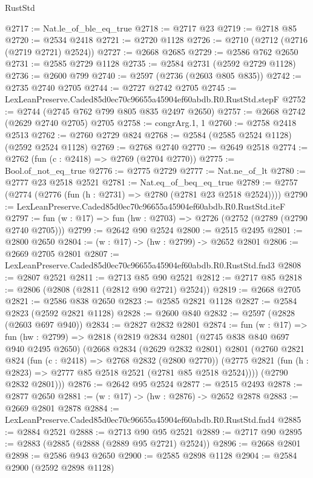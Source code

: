 \begin{lexlean}{RustStd}
\begin{coremodule}
@2717 := Nat.le_of_ble_eq_true
@2718 := @2717 @23
@2719 := @2718 @85
@2720 := @2534 @2418
@2721 := @2720 @1128
@2726 := @2710 (@2712 (@2716 (@2719 @2721) @2524))
@2727 := @2668 @2685
@2729 := @2586 @762 @2650
@2731 := @2585 @2729 @1128
@2735 := @2584 @2731 (@2592 @2729 @1128)
@2736 := @2600 @799
@2740 := @2597 (@2736 (@2603 @805 @835))
@2742 := @2735 @2740 @2705
@2744 := @2727 @2742 @2705
@2745 := LexLeanPreserve.Caded85d0ec70c96655a45904ef60abdb.R0.RustStd.stepF
@2752 := @2744 (@2745 @762 @799 @805 @835 @2497 @2650)
@2757 := @2668 @2742 (@2629 @2740 @2705) @2705
@2758 := congrArg.{1, 1}
@2760 := @2758 @2418 @2513
@2762 := @2760 @2729 @824
@2768 := @2584 (@2585 @2524 @1128) (@2592 @2524 @1128)
@2769 := @2768 @2740
@2770 := @2649 @2518
@2774 := @2762 (fun (c : @2418) => @2769 (@2704 @2770))
@2775 := Bool.of_not_eq_true
@2776 := @2775 @2729
@2777 := Nat.ne_of_lt
@2780 := @2777 @23 @2518 @2521
@2781 := Nat.eq_of_beq_eq_true
@2789 := @2757 (@2774 (@2776 (fun (h : @2731) => @2780 (@2781 @23 @2518 @2524))))
@2790 := LexLeanPreserve.Caded85d0ec70c96655a45904ef60abdb.R0.RustStd.iteF
@2797 := fun (w : @17) => fun (hw : @2703) => @2726 (@2752 (@2789 (@2790 @2740 @2705)))
@2799 := @2642 @90 @2524
@2800 := @2515 @2495
@2801 := @2800 @2650
@2804 := (w : @17) -> (hw : @2799) -> @2652 @2801
@2806 := @2669 @2705 @2801
@2807 := LexLeanPreserve.Caded85d0ec70c96655a45904ef60abdb.R0.RustStd.fnd3
@2808 := @2807 @2521
@2811 := @2713 @85 @90 @2521
@2812 := @2717 @85
@2818 := @2806 (@2808 (@2811 (@2812 @90 @2721) @2524))
@2819 := @2668 @2705
@2821 := @2586 @838 @2650
@2823 := @2585 @2821 @1128
@2827 := @2584 @2823 (@2592 @2821 @1128)
@2828 := @2600 @840
@2832 := @2597 (@2828 (@2603 @697 @940))
@2834 := @2827 @2832 @2801
@2874 := fun (w : @17) =>
  fun (hw : @2799) =>
  @2818
    (@2819
      @2834
      @2801
      (@2745 @838 @840 @697 @940 @2495 @2650)
      (@2668
        @2834
        (@2629 @2832 @2801)
        @2801
        (@2760
          @2821
          @824
          (fun (c : @2418) => @2768 @2832 (@2800 @2770))
          (@2775 @2821 (fun (h : @2823) => @2777 @85 @2518 @2521 (@2781 @85 @2518 @2524))))
        (@2790 @2832 @2801)))
@2876 := @2642 @95 @2524
@2877 := @2515 @2493
@2878 := @2877 @2650
@2881 := (w : @17) -> (hw : @2876) -> @2652 @2878
@2883 := @2669 @2801 @2878
@2884 := LexLeanPreserve.Caded85d0ec70c96655a45904ef60abdb.R0.RustStd.fnd4
@2885 := @2884 @2521
@2888 := @2713 @90 @95 @2521
@2889 := @2717 @90
@2895 := @2883 (@2885 (@2888 (@2889 @95 @2721) @2524))
@2896 := @2668 @2801
@2898 := @2586 @943 @2650
@2900 := @2585 @2898 @1128
@2904 := @2584 @2900 (@2592 @2898 @1128)

\end{coremodule}
\end{lexlean}
